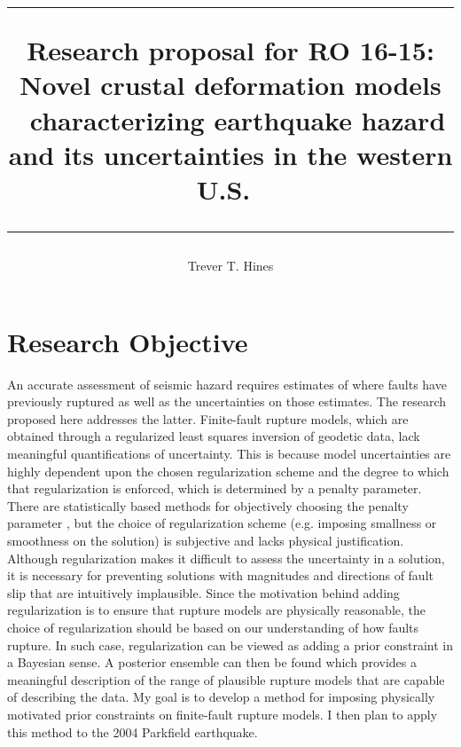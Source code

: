 \documentclass[12pt]{article}
\title{	
 \rule{\headwidth}{1.0pt}
 Research proposal for RO 16-15:
 Novel crustal deformation models \
 characterizing earthquake hazard and its uncertainties in the western U.S.\
 \rule{\headwidth}{1.0pt}
 \author{Trever T. Hines}}
\begin{document}
\maketitle

\section*{Research Objective}

An accurate assessment of seismic hazard requires estimates of where faults have previously ruptured as well as the uncertainties on those estimates.  The research proposed here addresses the latter. Finite-fault rupture models, which are obtained through a regularized least squares inversion of geodetic data, lack meaningful quantifications of uncertainty. This is because model uncertainties are highly dependent upon the chosen regularization scheme and the degree to which that regularization is enforced, which is determined by a penalty parameter. There are statistically based methods for objectively choosing the penalty parameter \citep[e.g.][]{Yabuki1992,Fukuda2008}, but the choice of regularization scheme (e.g. imposing smallness or smoothness on the solution) is subjective and lacks physical justification.  Although regularization makes it difficult to assess the uncertainty in a solution, it is necessary for preventing solutions with magnitudes and directions of fault slip that are intuitively implausible. Since the motivation behind adding regularization is to ensure that rupture models are physically reasonable, the choice of regularization should be based on our understanding of how faults rupture.  In such case, regularization can be viewed as adding a prior constraint in a Bayesian sense. A posterior ensemble can then be found which provides a meaningful description of the range of plausible rupture models that are capable of describing the data.  My goal is to develop a method for imposing physically motivated prior constraints on finite-fault rupture models. I then plan to apply this method to the 2004 Parkfield earthquake.  
\end{document}

